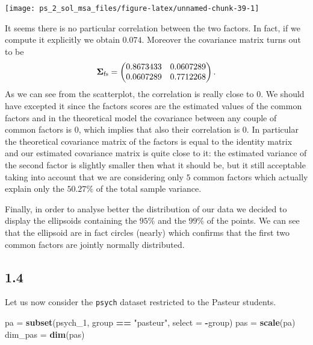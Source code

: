 \documentclass[
]{article}
\newenvironment{Shaded}{\begin{snugshade}}{\end{snugshade}}
\newcommand{\AttributeTok}[1]{\textcolor[rgb]{0.13,0.29,0.53}{#1}}
\newcommand{\FunctionTok}[1]{\textcolor[rgb]{0.13,0.29,0.53}{\textbf{#1}}}
\newcommand{\NormalTok}[1]{#1}
\newcommand{\OtherTok}[1]{\textcolor[rgb]{0.56,0.35,0.01}{#1}}
\newcommand{\SpecialCharTok}[1]{\textcolor[rgb]{0.81,0.36,0.00}{\textbf{#1}}}
\newcommand{\StringTok}[1]{\textcolor[rgb]{0.31,0.60,0.02}{#1}}
\theoremstyle{plain}
\begin{document}
\begin{center}\texttt{[image: ps\_2\_sol\_msa\_files/figure-latex/unnamed-chunk-39-1]} \end{center}

It seems there is no particular correlation between the two factors. In
fact, if we compute it explicitly we obtain \(0.074\). Moreover the
covariance matrix turns out to be \begin{equation*}
    \boldsymbol{\Sigma}_{\rm{fs}} = \begin{pmatrix}
        0.8673433 & 0.0607289 \\
        0.0607289 & 0.7712268
    \end{pmatrix}.
\end{equation*} As we can see from the scatterplot, the correlation is
really close to \(0\). We should have excepted it since the factors
scores are the estimated values of the common factors and in the
theoretical model the covariance between any couple of common factors is
\(0\), which implies that also their correlation is \(0\). In particular
the theoretical covariance matrix of the factors is equal to the
identity matrix and our estimated covariance matrix is quite close to
it: the estimated variance of the second factor is slightly smaller then
what it should be, but it still acceptable taking into account that we
are considering only \(5\) common factors which actually explain only
the \(50.27\%\) of the total sample variance.

Finally, in order to analyse better the distribution of our data we
decided to display the ellipsoids containing the \(95\%\) and the
\(99\%\) of the points. We can see that the ellipsoid are in fact
circles (nearly) which confirms that the first two common factors are
jointly normally distributed.

\hypertarget{section-3}{%
\subsection{1.4}\label{section-3}}

Let us now consider the \texttt{psych} dataset restricted to the Pasteur
students.

\begin{Shaded}
\begin{Highlighting}[]
\NormalTok{pa }\OtherTok{=} \FunctionTok{subset}\NormalTok{(psych\_1, group }\SpecialCharTok{==} \StringTok{"pasteur"}\NormalTok{, }\AttributeTok{select =} \SpecialCharTok{{-}}\NormalTok{group)}
\NormalTok{pas }\OtherTok{=} \FunctionTok{scale}\NormalTok{(pa)}
\NormalTok{dim\_pas }\OtherTok{=} \FunctionTok{dim}\NormalTok{(pas)}
\end{Highlighting}
\end{Shaded}
\end{document}

